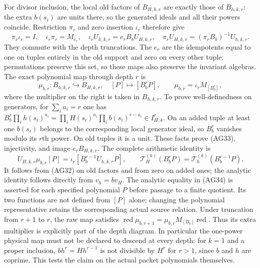 For divisor inclusion, the local old factors of $B_{H,k,r}$
are exactly those of $B_{h,k,r}$: the extra $b(s_i)$ are units
there, so the generated ideals and all their powers coincide.
Restriction $\pi_r$ and zero insertion $\iota_r$ therefore give
\[
 \pi_r\iota_r=I,\quad\iota_r\pi_r=M_{e_r},\quad
 \iota_r U_{h,k,r}=e_r B_b U_{H,k,r},\quad
 \pi_rU_{H,k,r}=(\pi_rB_b)^{-1}U_{h,k,r}.
 \tag{AG32}
\]
They commute with the depth truncations.  The $e_r$ are the
idempotents equal to one on tuples entirely in the old support
and zero on every other tuple; permutations preserve this set,
so these maps also preserve the invariant algebras.
The exact polynomial map through depth $r$ is
\[
 \mu_{b,r}:B_{h,k,r}\hookrightarrow B_{H,k,r},
       \quad[P]\mapsto[B_b^rP],\qquad
 \mu_{b,r}=\iota_r M_{[B_b^r]},
 \tag{AG33}
\]
where the multiplier on the right is taken in $B_{h,k,r}$.
To prove well-definedness on generators, for $\sum_i a_i=r$
one has $B_b^r\prod_i h(s_i)^{a_i}
=\prod_iH(s_i)^{a_i}\prod_i b(s_i)^{r-a_i}\in I_{H,k}^r$.
On an added tuple at least one $b(s_i)$ belongs to the corresponding
local generator ideal, so $B_b^r$ vanishes modulo its $r$th power.
On old tuples it is a unit.  These facts prove (AG33), injectivity,
and image $e_rB_{H,k,r}$.
The complete arithmetic identity is
\[
 U_{H,k,r}\mu_{b,r}[P]
       =\iota_r[ B_b^{r-1}U_{h,k,r}P],\qquad
 \mathcal T_H^{(k)}(B_b^rP)
       =\mathcal T_h^{(k)}(B_b^{r-1}P).
 \tag{AG34}
\]
It follows from (AG32) on old factors and from zero on added ones;
the analytic identity follows directly from $v_h=bv_H$.
The analytic equality in (AG34) is asserted for each specified
polynomial $P$ before passage to a finite quotient.  Its two
functions are not defined from $[P]$ alone; changing the polynomial
representative retains the corresponding actual source relation.
Under truncation from $r+1$ to $r$, the raw map satisfies
$\operatorname{red}\mu_{b,r+1}
=\mu_{b,r}M_{[B_b]}\operatorname{red}$.
Thus its extra multiplier is explicitly part of the depth diagram.
In particular the one-power physical map must not be declared to
descend at every depth: for $k=1$ and a proper inclusion,
$b h^r=Hh^{r-1}$ is not divisible by $H^r$ for $r>1$, since
$b$ and $h$ are coprime.  This tests the claim on the actual
packet polynomials themselves.

